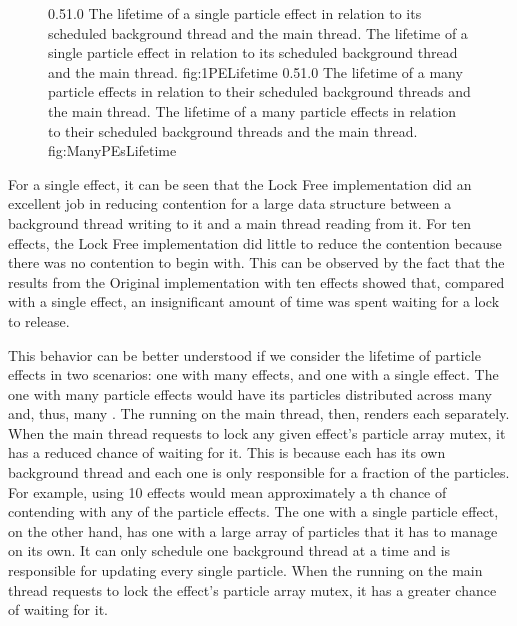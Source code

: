 \begin{figure}[t]
\addtocounter{figure}{-1}

	{0.5}{1.0}
	{The lifetime of a single particle effect in relation to its scheduled background thread and the main thread.}
	{The lifetime of a single particle effect in relation to its scheduled background thread and the main thread.}
	{fig:1PELifetime}
	{0.5}{1.0}
	{The lifetime of a many particle effects in relation to their scheduled background threads and the main thread.}
	{The lifetime of a many particle effects in relation to their scheduled background threads and the main thread.}
	{fig:ManyPEsLifetime}

\end{figure}

For a single effect, it can be seen that the Lock Free implementation did an excellent job in reducing contention for a large data structure between a background thread writing to it and a main thread reading from it. For ten effects, the Lock Free implementation did little to reduce the contention because there was no contention to begin with. This can be observed by the fact that the results from the Original implementation with ten effects showed that, compared with a single effect, an insignificant amount of time was spent waiting for a lock to release.

This behavior can be better understood if we consider the lifetime of particle effects in two scenarios: one with many effects, and one with a single effect. The one with many particle effects would have its particles distributed across many  and, thus, many . The  running on the main thread, then, renders each  separately. When the main thread requests to lock any given effect's particle array mutex, it has a reduced chance of waiting for it. This is because each  has its own background thread and each one is only responsible for a fraction of the particles. For example, using 10 effects would mean approximately a th chance of contending with any of the particle effects. The one with a single particle effect, on the other hand, has one  with a large array of particles that it has to manage on its own. It can only schedule one background thread at a time and is responsible for updating every single particle. When the  running on the main thread requests to lock the effect's particle array mutex, it has a greater chance of waiting for it. 

